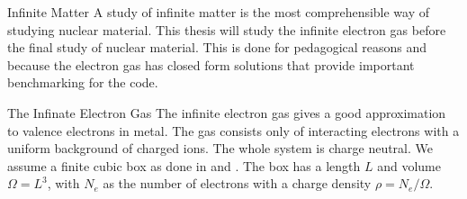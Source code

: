 \documentclass[twoside,english]{uiofysmaster}
\begin{document}
\begin{chapter}{Infinite Matter}
	A study of infinite matter is the most comprehensible way of studying nuclear material. This thesis will study the infinite electron gas before the final study of nuclear material. This is done for pedagogical reasons and because the electron gas has closed form solutions that provide important benchmarking for the code. 
	\begin{section}{The Infinate Electron Gas}
		The infinite electron gas gives a good approximation to valence electrons in metal. The gas consists only of interacting electrons with a uniform background of charged ions. The whole system is charge neutral. We assume a finite cubic box as done in \cite{Shepherd2012} and \cite{Shepherd2013}. The box has a length $L$ and volume $\Omega = L^3$, with $N_e$ as the number of electrons with a charge density $\rho = N_e / \Omega$.


\end{section}
\end{chapter}
\end{document}
